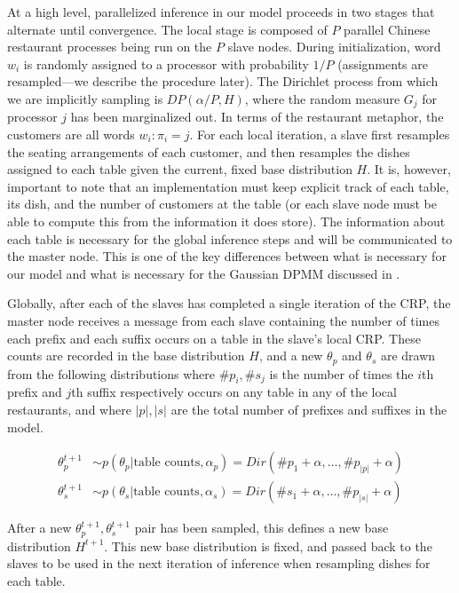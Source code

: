 At a high level, parallelized inference in our model proceeds in two
stages that alternate until convergence. The local stage is composed
of $P$ parallel Chinese restaurant processes being run on the $P$
slave nodes. During initialization, word $w_i$ is randomly assigned to
a processor with probability $1/P$ (assignments are resampled---we
describe the procedure later). The Dirichlet process from which we are
implicitly sampling is $DP(\alpha/P, H)$, where the random measure
$G_j$ for processor $j$ has been marginalized out. In terms of the
restaurant metaphor, the customers are all words $w_i : {\pi_i =
  j}$. For each local iteration, a slave first resamples the seating
arrangements of each customer, and then resamples the dishes assigned
to each table given the current, fixed base distribution $H$. It is,
however, important to note that an implementation must keep explicit
track of each table, its dish, and the number of customers at the
table (or each slave node must be able to compute this from the
information it does store). The information about each table is
necessary for the global inference steps and will be communicated to
the master node. This is one of the key differences between what is
necessary for our model and what is necessary for the Gaussian DPMM
discussed in \cite{williamson2013}.

Globally, after each of the slaves has completed a single iteration of
the CRP, the master node receives a message from each slave containing
the number of times each prefix and each suffix occurs on a table in
the slave's local CRP. These counts are recorded in the base
distribution $H$, and a new $\theta_p$ and $\theta_s$ are drawn from
the following distributions where $\#p_i, \#s_j$ is the number of times
the $i$th prefix and $j$th suffix respectively occurs on any table in
any of the local restaurants, and where $|p|, |s|$ are the total
number of prefixes and suffixes in the model.

\begin{align}
  \theta_p^{t+1} & \sim p(\theta_p | \text{table counts}, \alpha_p) = Dir(\#p_1 + \alpha, \ldots, \#p_{|p|} + \alpha) \\
  \theta_s^{t+1} & \sim p(\theta_s | \text{table counts}, \alpha_s) = Dir(\#s_1 + \alpha, \ldots, \#p_{|s|} + \alpha)
\end{align}

After a new $\theta_p^{t+1}, \theta_s^{t+1}$ pair has been sampled,
this defines a new base distribution $H^{t+1}$. This new base
distribution is fixed, and passed back to the slaves to be used in the
next iteration of inference when resampling dishes for each table.

